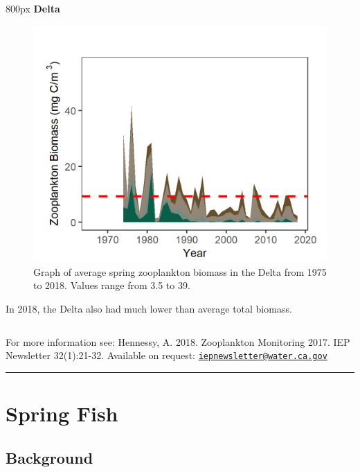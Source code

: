 \documentclass[
]{book}
\begin{document}
\begin{column}{800px\textwidth}
\textbf{Delta}

\begin{figure}
\includegraphics[width=15.25in]{figures/zoops_dtspring} \caption{Graph of average spring zooplankton biomass in the Delta from 1975 to 2018. Values range from 3.5 to 39.}\label{fig:unnamed-chunk-29}
\end{figure}

In 2018, the Delta also had much lower than average total biomass.
\end{column}

\begin{disclaimer}
For more information see: Hennessy, A. 2018. Zooplankton Monitoring
2017. IEP Newsletter 32(1):21-32. Available on request:
\href{mailto:iepnewsletter@water.ca.gov}{\nolinkurl{iepnewsletter@water.ca.gov}}
\end{disclaimer}

\begin{center}\rule{0.5\linewidth}{0.5pt}\end{center}

\hypertarget{spring-fish}{%
\section{Spring Fish}\label{spring-fish}}

\hypertarget{background-4}{%
\subsection{Background}\label{background-4}}
\end{document}
